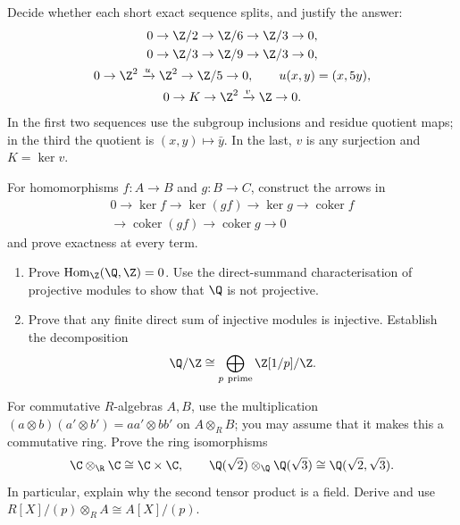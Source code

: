 \begin{exercise}[$\star$]\label{ex:whichsplit}
Decide whether each short exact sequence splits, and justify the answer:
\[
\begin{gathered}
0\to\Z/2\to\Z/6\to\Z/3\to0,\\
0\to\Z/3\to\Z/9\to\Z/3\to0,\\
0\to\Z^2\xrightarrow{u}\Z^2\to\Z/5\to0,
\qquad u(x,y)=(x,5y),\\
0\to K\to\Z^2\xrightarrow{v}\Z\to0.
\end{gathered}
\]
In the first two sequences use the subgroup inclusions and residue quotient maps; in the third the quotient is $(x,y)\mapsto\bar y$. In the last, $v$ is any surjection and $K=\ker v$.
\end{exercise}

\begin{exercise}[$\star\star$]\label{ex:composite}
For homomorphisms $f\colon A\to B$ and $g\colon B\to C$, construct the arrows in
\[
\begin{gathered}
0\to\ker f\to\ker(gf)\to\ker g\to\operatorname{coker}f\\
\to\operatorname{coker}(gf)\to\operatorname{coker}g\to0
\end{gathered}
\]
and prove exactness at every term.
\end{exercise}

\begin{exercise}[$\star\star$]\label{ex:qnotproj}
\leavevmode
\begin{enumerate}[label=(\alph*)]
\item Prove $\operatorname{Hom}_\Z(\Q,\Z)=0$. Use the direct-summand characterisation of projective modules to show that $\Q$ is not projective.
\item Prove that any finite direct sum of injective modules is injective. Establish the decomposition
\[
\Q/\Z\cong\bigoplus_{p\ \mathrm{prime}}\Z[1/p]/\Z.
\]
\end{enumerate}
\end{exercise}

\begin{exercise}[$\star\star$]\label{ex:tensoralgebra}
For commutative $R$-algebras $A,B$, use the multiplication $(a\otimes b)(a'\otimes b')=aa'\otimes bb'$ on $A\otimes_RB$; you may assume that it makes this a commutative ring. Prove the ring isomorphisms
\[
\C\otimes_\R\C\cong\C\times\C,
\qquad
\Q(\sqrt2)\otimes_\Q\Q(\sqrt3)\cong\Q(\sqrt2,\sqrt3).
\]
In particular, explain why the second tensor product is a field. Derive and use $R[X]/(p)\otimes_RA\cong A[X]/(p)$.
\end{exercise}

